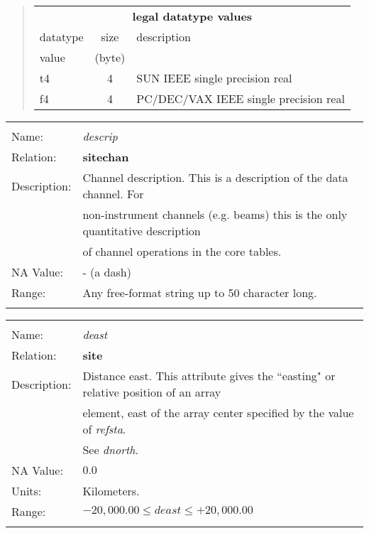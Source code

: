 \begin{quotation}
\begin{tabular}{|lcl|}  \hline
\multicolumn{3}{|c|}{{\bf legal datatype values}} \\ \cline{1-3}
\multicolumn{1}{|l}{datatype \vspace{-0.07 in}} & \multicolumn{1}{c}{size} & \multicolumn{1}{l|}{description} \\
\multicolumn{1}{|l}{value} &  \multicolumn{1}{c}{(byte)} & \\ \cline{1-3}
t4 & 4 & SUN IEEE single precision real \\
f4 & 4 & PC/DEC/VAX IEEE single precision real \\ \cline{1-3}
\end{tabular}
\end{quotation}
\begin{tabular*}{6.5 in}{ll} \hline
\\
Name: & {\it descrip } \\
Relation: & {\bf sitechan} \\
Description: & Channel description. This is a description of the data channel. For \\
& non-instrument channels (e.g. beams) this is the only quantitative description \\
& of channel operations in the core tables. \\
NA Value: & - (a dash) \\
Range: & Any free-format string up to 50 character long. \\
& \\
\end{tabular*}
\begin{tabular*}{6.5 in}{ll} \hline
\\
Name: & {\it deast } \\
Relation: & {\bf site} \\
Description: & Distance east. This attribute gives the ``easting" or relative position of an array \\
&  element, east of the array center specified by the value of {\it refsta}. \\
& See {\it dnorth}. \\
NA Value: & $0.0$ \\
Units: & Kilometers. \\
Range: & $-20,000.00 \leq deast \leq +20,000.00$ \\
&\\
\end{tabular*}
